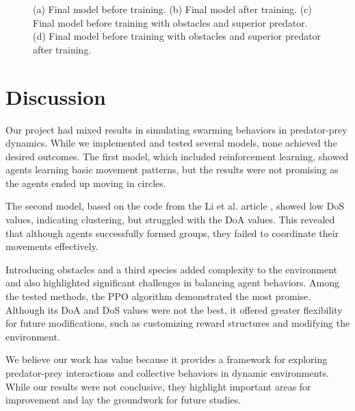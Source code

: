 \documentclass[9pt]{pnas-new}
\begin{document}
\begin{figure}[ht]
		\caption{(a) Final model before training. (b) Final model after training. (c) Final model before training with obstacles and superior predator. (d) Final model before training with obstacles and superior predator after training. }
		\label{fig:final}
	\end{figure}
	
	
	\section*{Discussion}
	Our project had mixed results in simulating swarming behaviors in predator-prey dynamics. While we implemented and tested several models, none achieved the desired outcomes. The first model, which included reinforcement learning, showed agents learning basic movement patterns, but the results were not promising as the agents ended up moving in circles. 

	The second model, based on the code from the Li et al. article \cite{li2023predator}, showed low DoS values, indicating clustering, but struggled with the DoA values. This revealed that although agents successfully formed groups, they failed to coordinate their movements effectively. 

	Introducing obstacles and a third species added complexity to the environment and also highlighted significant challenges in balancing agent behaviors. Among the tested methods, the PPO algorithm demonstrated the most promise. Although its DoA and DoS values were not the best, it offered greater flexibility for future modifications, such as customizing reward structures and modifying the environment.

	We believe our work has value because it provides a framework for exploring predator-prey interactions and collective behaviors in dynamic environments. While our results were not conclusive, they highlight important areas for improvement and lay the groundwork for future studies.
	
	\showacknow %
	
	
	\begin{multicols}{2}
	\end{multicols}
	
	
\end{document}
